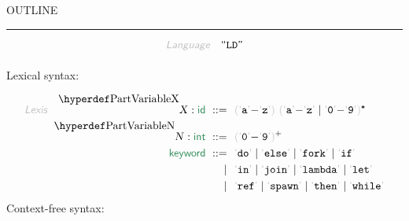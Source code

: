 


    OUTLINE
  \tableofcontents
\begin{center}
\rule{3in}{0.4pt}
\end{center}

\begin{displaymath}
\KEY{Language} \quad \STRING{LD}
\end{displaymath}

\begin{align*}
  [ \
  \textsf{\SECTREF{1}} \ & \textsf{Lexical constructs} \\
  \textsf{\SECTREF{2}} \ & \textsf{Call-by-value lambda-calculus} \\
  \textsf{\SECTREF{3}} \ & \textsf{Arithmetic and Boolean expressions} \\
  \textsf{\SECTREF{4}} \ & \textsf{References and imperatives} \\
  \textsf{\SECTREF{5}} \ & \textsf{Multithreading} \\
  \textsf{\SECTREF{6}} \ & \textsf{Programs} \\
  \textsf{\SECTHYPER{../.}{LD-Disambiguation}{A}} \ & \textsf{Disambiguation}
  \ ]
\end{align*}
Lexical syntax:

\begin{align*}
  \KEY{Lexis} \quad
    \VARDECL{X} : \SYN{id}
      \ ::= \ & \
      \LEFTGROUP \LEX{a} {-} \LEX{z} \RIGHTGROUP \ \LEFTGROUP \LEX{a} {-} \LEX{z} \mid \LEX{0} {-} \LEX{9} \RIGHTGROUP\STAR
    \\
    \VARDECL{N} : \SYN{int}
      \ ::= \ & \
      \LEFTGROUP \LEX{0} {-} \LEX{9} \RIGHTGROUP\PLUS
    \\
     \SYN{keyword}
      \ ::= \ & \
      \LEX{do} \mid \LEX{else} \mid \LEX{fork} \mid \LEX{if} \\
      \ \mid \ & \ \LEX{in} \mid \LEX{join} \mid \LEX{lambda} \mid \LEX{let} \\
      \ \mid \ & \ \LEX{ref} \mid \LEX{spawn} \mid \LEX{then} \mid \LEX{while}
\end{align*}
Context-free syntax:

